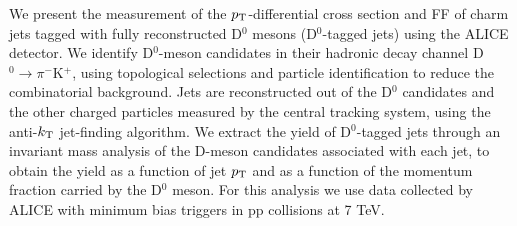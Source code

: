 \documentclass[12pt]{article}
\begin{document}
We present the measurement of the $p_{\rm T}$-differential cross section and FF of charm jets tagged with fully reconstructed D$^0$ mesons (D$^0$-tagged jets) using the ALICE detector.
We identify D$^0$-meson candidates in their hadronic decay channel D$^0\rightarrow \pi^{-}$K$^{+}$, using topological selections and particle identification to reduce the combinatorial background.
Jets are reconstructed out of the D$^0$ candidates and the other charged particles measured by the central tracking system, 
using the anti-$k_{\rm T}$ jet-finding algorithm.
We extract the yield of D$^0$-tagged jets through an invariant mass analysis of the D-meson candidates associated with each jet, 
to obtain the yield as a function of jet $p_{\rm T}$ and as a function of the momentum fraction carried by the D$^0$ meson. 
For this analysis we use data collected
by ALICE with minimum bias triggers in pp collisions at 7 TeV. 
\end{document}
